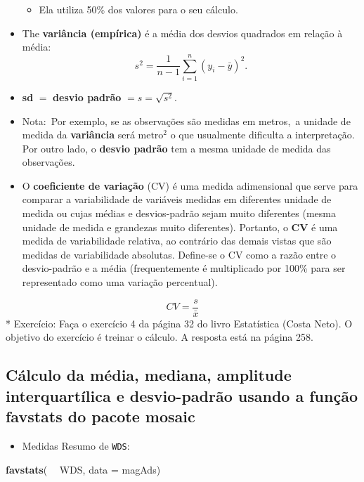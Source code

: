 \documentclass[]{article}
\newenvironment{Shaded}{\begin{snugshade}}{\end{snugshade}}
\newcommand{\KeywordTok}[1]{\textcolor[rgb]{0.13,0.29,0.53}{\textbf{#1}}}
\newcommand{\DataTypeTok}[1]{\textcolor[rgb]{0.13,0.29,0.53}{#1}}
\newcommand{\StringTok}[1]{\textcolor[rgb]{0.31,0.60,0.02}{#1}}
\newcommand{\OperatorTok}[1]{\textcolor[rgb]{0.81,0.36,0.00}{\textbf{#1}}}
\newcommand{\NormalTok}[1]{#1}
\providecommand{\tightlist}{%
  \setlength{\itemsep}{0pt}\setlength{\parskip}{0pt}}
\begin{document}
\begin{itemize}
  \begin{itemize}
  \tightlist
  \item
    Ela utiliza 50\% dos valores para o seu cálculo.
  \end{itemize}
\item
  The \textbf{variância (empírica)} é a média dos desvios quadrados em
  relação à média: \[
      s^2=\frac{1}{n-1}\sum_{i=1}^n (y_i-\bar{y})^2.
    \]
\item
  \textbf{sd} \(=\) \textbf{desvio padrão} \(= s=\sqrt{s^2}\).
\item
  Nota:~Por exemplo, se as observações são medidas em metros,~a unidade
  de medida da \textbf{variância} será \(\text{metro}^2\) o que
  usualmente dificulta a interpretação. Por outro lado, o \textbf{desvio
  padrão} tem a mesma unidade de medida das observações. 
\item
  O \textbf{coeficiente de variação} (CV) é uma medida adimensional que
  serve para comparar a variabilidade de variáveis medidas em diferentes
  unidade de medida ou cujas médias e desvios-padrão sejam muito
  diferentes (mesma unidade de medida e grandezas muito diferentes).
  Portanto, o \textbf{CV} é uma medida de variabilidade relativa, ao
  contrário das demais vistas que são medidas de variabilidade
  absolutas. Define-se o CV como a razão entre o desvio-padrão e a média
  (frequentemente é multiplicado por 100\% para ser representado como
  uma variação percentual).
\end{itemize}

\[ CV = \frac{s}{\bar{x}} \] * Exercício: Faça o exercício 4 da página
32 do livro Estatística (Costa Neto). O objetivo do exercício é treinar
o cálculo. A resposta está na página 258.

\subsection{Cálculo da média, mediana, amplitude interquartílica e
desvio-padrão usando a função favstats do pacote
mosaic}\label{calculo-da-media-mediana-amplitude-interquartilica-e-desvio-padrao-usando-a-funcao-favstats-do-pacote-mosaic}

\begin{itemize}
\tightlist
\item
  Medidas Resumo de \texttt{WDS}:
\end{itemize}

\begin{Shaded}
\begin{Highlighting}[]
\KeywordTok{favstats}\NormalTok{( }\OperatorTok{~}\StringTok{ }\NormalTok{WDS, }\DataTypeTok{data =}\NormalTok{ magAds)}
\end{Highlighting}
\end{Shaded}
\end{document}
